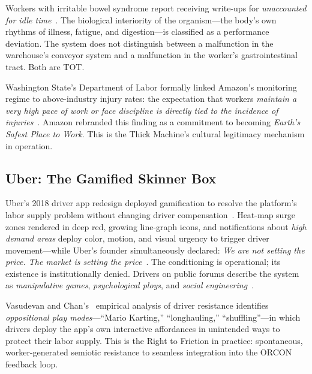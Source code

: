 \documentclass[runningheads]{llncs}
\begin{document}
Workers with irritable bowel syndrome report receiving write-ups for
\emph{unaccounted for idle time}~\cite{timeamazon2023}. The biological
interiority of the organism---the body's own rhythms of illness, fatigue, and
digestion---is classified as a performance deviation. The system does not
distinguish between a malfunction in the warehouse's conveyor system and a
malfunction in the worker's gastrointestinal tract. Both are TOT.

Washington State's Department of Labor formally linked Amazon's monitoring
regime to above-industry injury rates: the expectation that workers \emph{maintain
a very high pace of work or face discipline is directly tied to the incidence of
injuries}~\cite{seattletimes2021amazon}. Amazon rebranded this finding as a
commitment to becoming \emph{Earth's Safest Place to Work}. This is the Thick
Machine's cultural legitimacy mechanism in operation.

\subsection{Uber: The Gamified Skinner Box}

Uber's 2018 driver app redesign deployed gamification to resolve the platform's
labor supply problem without changing driver compensation~\cite{uber2022gig}.
Heat-map surge zones rendered in deep red, growing line-graph icons, and
notifications about \emph{high demand areas} deploy color, motion, and visual
urgency to trigger driver movement---while Uber's founder simultaneously
declared: \emph{We are not setting the price. The market is setting the
price}~\cite{ubercasestudy2016}. The conditioning is operational; its existence
is institutionally denied. Drivers on public forums describe the system as
\emph{manipulative games}, \emph{psychological ploys}, and \emph{social
engineering}~\cite{uber2022gig}.

Vasudevan and Chan's~\cite{vasudevan2022gamification} empirical analysis of
driver resistance identifies \emph{oppositional play modes}---``Mario Karting,''
``longhauling,'' ``shuffling''---in which drivers deploy the app's own
interactive affordances in unintended ways to protect their labor supply. This
is the Right to Friction in practice: spontaneous, worker-generated semiotic
resistance to seamless integration into the ORCON feedback loop.

\end{document}
